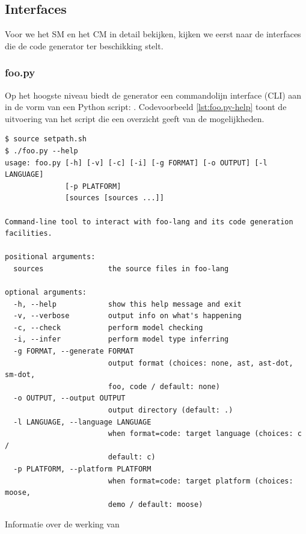 \subsection{Interfaces}
\label{subsection:devel-codegen-interfaces}

Voor we het SM en het CM in detail bekijken, kijken we eerst naar de interfaces
die de code generator ter beschikking stelt.

\subsubsection{foo.py}

Op het hoogste niveau biedt de generator een commandolijn interface (CLI) aan
in de vorm van een Python script: . Codevoorbeeld \ref{lst:foo.py-help}
toont de uitvoering van het script die een overzicht geeft van de mogelijkheden.

\begin{listing}[ht]
  \begin{verbatim}
$ source setpath.sh
$ ./foo.py --help
usage: foo.py [-h] [-v] [-c] [-i] [-g FORMAT] [-o OUTPUT] [-l LANGUAGE]
              [-p PLATFORM]
              [sources [sources ...]]

Command-line tool to interact with foo-lang and its code generation
facilities.

positional arguments:
  sources               the source files in foo-lang

optional arguments:
  -h, --help            show this help message and exit
  -v, --verbose         output info on what's happening
  -c, --check           perform model checking
  -i, --infer           perform model type inferring
  -g FORMAT, --generate FORMAT
                        output format (choices: none, ast, ast-dot, sm-dot,
                        foo, code / default: none)
  -o OUTPUT, --output OUTPUT
                        output directory (default: .)
  -l LANGUAGE, --language LANGUAGE
                        when format=code: target language (choices: c /
                        default: c)
  -p PLATFORM, --platform PLATFORM
                        when format=code: target platform (choices: moose,
                        demo / default: moose)
  \end{verbatim}
  \vspace{-5mm}
  \caption{Informatie over de werking van }
  \label{lst:foo.py-help}
\end{listing}

